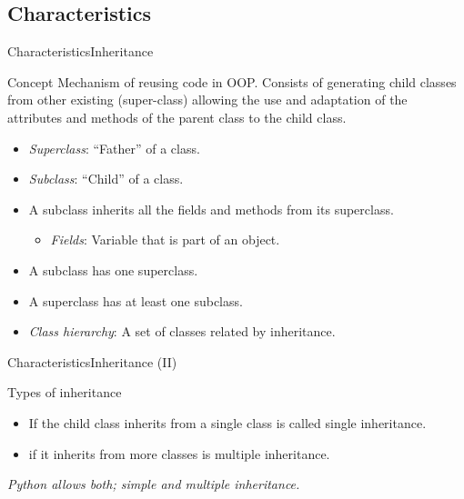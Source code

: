 \documentclass[10pt,compress]{beamer} %
\begin{document}


\subsection{Characteristics}

\begin{frame}{Characteristics}{Inheritance}
\vspace{-0.2cm}
	\begin{block}{Concept}
	Mechanism of \alert{reusing} code in OOP. Consists of generating child classes from other existing (\alert{super-class}) allowing the use and adaptation of the attributes and methods of the parent class to the child class. 
  	\end{block}	
\vspace{-0.2cm}
\begin{block}{}
\begin{itemize}
		\item \small{\textit{Superclass}: ``Father'' of a class.}
		\item \small{\textit{Subclass}: ``Child'' of a class.}
		\item \small{A subclass inherits all the fields and methods from its superclass.}
		\begin{itemize}
		\item \footnotesize \textit{Fields}: Variable that is part of an object.
		\end{itemize}
		\item \small{A subclass has \alert{one} superclass.}
		\item \small{A superclass has \alert{at least one} subclass.}
		\item \small{\textit{Class hierarchy}: A set of classes related by inheritance.}
\end{itemize}
	\end{block}
\end{frame}

\begin{frame}{Characteristics}{Inheritance (II)}

	\begin{block}{Types of inheritance}
	\begin{itemize}
		\item If the child class inherits from a single class is called \alert{single inheritance}.
		\item if it inherits from more classes is \alert{multiple inheritance}.
	\end{itemize}
	\end{block}
	\medskip
	   \textit{Python allows both; simple and multiple inheritance.}
\end{frame}
\end{document}
